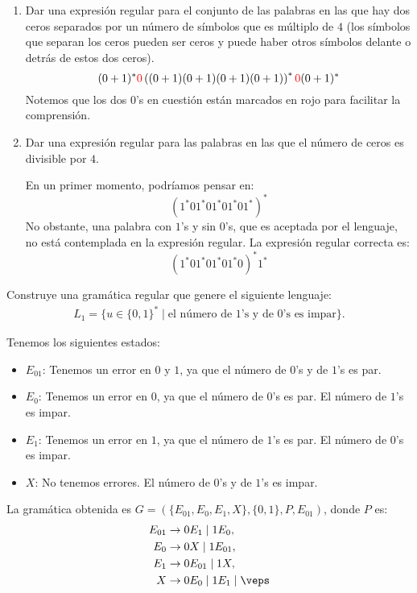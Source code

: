 \begin{ejercicio}
\begin{enumerate}
        \item Dar una expresión regular para el conjunto de las palabras en las que hay dos ceros separados por un número de símbolos que es múltiplo de $4$ (los símbolos que separan los ceros pueden ser ceros y puede haber otros símbolos delante o detrás de estos dos ceros).
        \begin{equation*}
            (0+1)^*{\color{red}0}\left((0+1)(0+1)(0+1)(0+1)\right)^*{\color{red}0}(0+1)^*
        \end{equation*}
        Notemos que los dos $0$'s en cuestión están marcados en rojo para facilitar la comprensión.
        \item Dar una expresión regular para las palabras en las que el número de ceros es divisible por $4$.
        
        En un primer momento, podríamos pensar en:
        \begin{equation*}
            (1^*01^*01^*01^*01^*)^*
        \end{equation*}
        No obstante, una palabra con $1$'s y sin $0$'s, que es aceptada por el lenguaje, no está contemplada en la expresión regular. La expresión regular correcta es:
        \begin{equation*}
            (1^*01^*01^*01^*0)^*1^*
        \end{equation*}
    \end{enumerate}
\end{ejercicio}

\begin{ejercicio}
    Construye una gramática regular que genere el siguiente lenguaje:
    \begin{align*}
        L_1 = \{u \in \{0, 1\}^* \mid \text{el número de $1$'s y de $0$'s es impar}\}.
    \end{align*}

    Tenemos los siguientes estados:
    \begin{itemize}
        \item \ul{$E_{01}$}: Tenemos un error en $0$ y $1$, ya que el número de $0$'s y de $1$'s es par.
        \item \ul{$E_0$}: Tenemos un error en $0$, ya que el número de $0$'s es par. El número de $1$'s es impar.
        \item \ul{$E_1$}: Tenemos un error en $1$, ya que el número de $1$'s es par. El número de $0$'s es impar.
        \item \ul{$X$}: No tenemos errores. El número de $0$'s y de $1$'s es impar.
    \end{itemize}

    La gramática obtenida es $G=(\{E_{01},E_0,E_1,X\}, \{0, 1\}, P, E_{01})$, donde $P$ es:
    \begin{align*}
        E_{01} &\to 0E_1 \mid 1E_0, \\
        E_0 &\to 0X \mid 1E_{01}, \\
        E_1 &\to 0E_{01} \mid 1X, \\
        X &\to 0E_0 \mid 1E_1 \mid \veps
    \end{align*}

\end{ejercicio}

